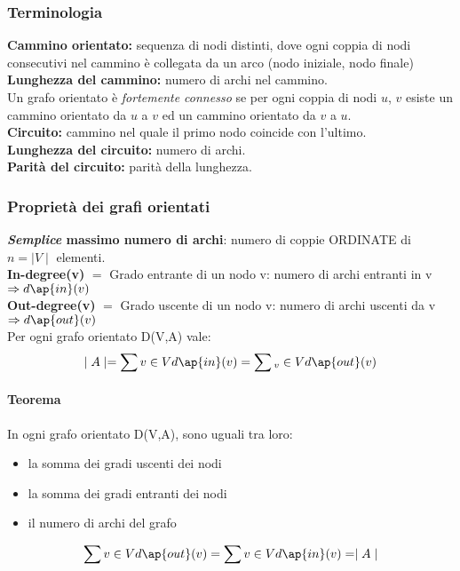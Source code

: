 \subsubsection{Terminologia}
\textbf{Cammino orientato:} sequenza di nodi distinti, dove ogni coppia di nodi consecutivi nel cammino è
collegata da un arco (nodo iniziale, nodo finale) \\
\textbf{Lunghezza del cammino:} numero di archi nel cammino. \\
Un grafo orientato è \textit{fortemente connesso} se per ogni coppia di nodi $u$, $v$ esiste un cammino orientato da $u$ a $v$ ed un cammino orientato da $v$ a $u$. \\
\textbf{Circuito:} cammino nel quale il primo nodo coincide con l'ultimo. \\
\textbf{Lunghezza del circuito:} numero di archi. \\
\textbf{Parità del circuito:} parità della lunghezza.

\subsubsection{Proprietà dei grafi orientati}
\textbf{\textit{Semplice} massimo numero di archi}: numero di coppie ORDINATE di \(n=\mid V \mid \) elementi. \\
\textbf{In-degree(v)} $=$ Grado entrante di un nodo v: numero di archi entranti in v \(\Rightarrow d\ap{in}(v)\) \\
\textbf{Out-degree(v)} $=$ Grado uscente di un nodo v: numero di archi uscenti da v \( \Rightarrow d\ap{out}(v) \)\\

Per ogni grafo orientato D(V,A) vale:
 \[ \mid A \mid = \sum{v \in V} d\ap{in}(v) = \sum{_v \in V} d\ap{out}(v) \] 

\paragraph{Teorema} In ogni grafo orientato D(V,A), sono uguali tra loro:
\begin{itemize}
\item la somma dei gradi uscenti dei nodi
\item la somma dei gradi entranti dei nodi
\item il numero di archi del grafo
\end{itemize}

\begin{equation}
    \sum{v \in V} d\ap{out}(v) = \sum{v \in V} d\ap{in}(v) = \mid A \mid 
\end{equation}

